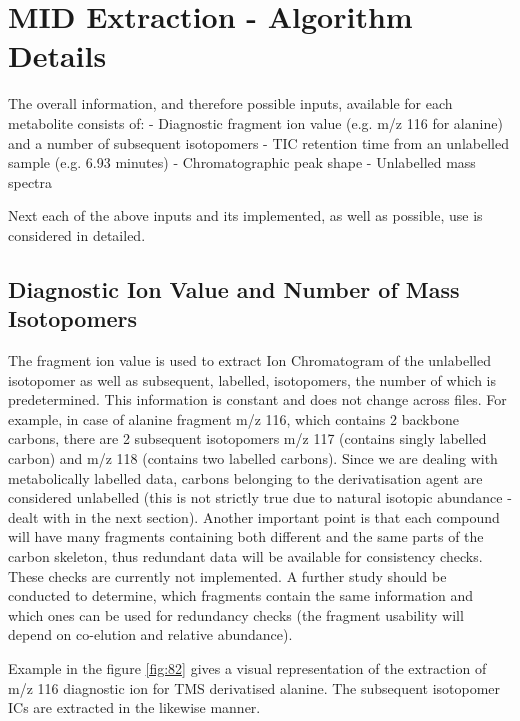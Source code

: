 \section
{MID Extraction - Algorithm Details}

\noindent

The overall information, and therefore possible inputs, available for each metabolite consists of:
- Diagnostic fragment ion value (e.g. m/z 116 for alanine) and a number of subsequent isotopomers
- TIC retention time from an unlabelled sample (e.g. 6.93 minutes)
- Chromatographic peak shape
- Unlabelled mass spectra

Next each of the above inputs and its implemented, as well as possible, use is considered in detailed.

\subsection
{Diagnostic Ion Value and Number of Mass Isotopomers}
The fragment ion value is used to extract Ion Chromatogram of the unlabelled 
isotopomer as well as subsequent, labelled, isotopomers, the number of which is 
predetermined. This information is constant and does not change across files. 
For example, in case of alanine fragment m/z 116, which contains 2 backbone 
carbons, there are 2 subsequent isotopomers m/z 117 (contains singly labelled 
carbon) and m/z 118 (contains two labelled carbons). Since we are dealing with 
metabolically labelled data, carbons belonging to the derivatisation agent are 
considered unlabelled (this is not strictly true due to natural isotopic 
abundance - dealt with in the next section).  Another important point is that 
each compound will have many fragments containing both different and the same 
parts of the carbon skeleton, thus redundant data will be available for 
consistency checks. These checks are currently not implemented. A further study 
should be conducted to determine, which fragments contain the same information 
and which ones can be used for redundancy checks (the fragment usability will 
depend on co-elution and relative abundance).

Example in the figure \ref{fig:82} gives a visual representation of the 
extraction of m/z 116 diagnostic ion for TMS derivatised alanine. The 
subsequent isotopomer ICs are extracted in the likewise manner.

